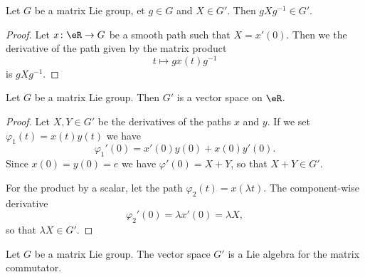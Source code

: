 \begin{lemma}
    Let \( G\) be a matrix Lie group, et \( g\in G\) and \( X\in G'\). Then \( gXg^{-1}\in G'\).
\end{lemma}

\begin{proof}
    Let \( x\colon \eR\to G\) be a smooth path such that \( X=x'(0)\). Then we the derivative of the path given by the matrix product
    \begin{equation}
        t\mapsto gx(t)g^{-1}
    \end{equation}
    is \( gXg^{-1}\).
\end{proof}

\begin{lemma}        \label{LEMooHQUYooSoiKbI}
    Let \( G\) be a matrix Lie group. Then \( G'\) is a vector space on \( \eR\).
\end{lemma}

\begin{proof}
    Let \( X,Y\in G'\) be the derivatives of the paths \( x\) and \( y\). If we set \( \varphi_1(t)=x(t)y(t)\) we have
    \begin{equation}
        \varphi_1'(0)=x'(0)y(0)+x(0)y'(0).
    \end{equation}
    Since \( x(0)=y(0)=e\) we have \( \varphi'(0)=X+Y\), so that \( X+Y\in G'\).

    For the product by a scalar, let the path \( \varphi_2(t)=x(\lambda t)\). The component-wise derivative
    \begin{equation}
        \varphi_2'(0)=\lambda x'(0)=\lambda X,
    \end{equation}
    so that \( \lambda X\in G'\).
\end{proof}

\begin{proposition}     \label{PROPooUKITooLnEKZW}
    Let \( G\) be a matrix Lie group. The vector space \( G'\) is a Lie algebra for the matrix commutator.
\end{proposition}

